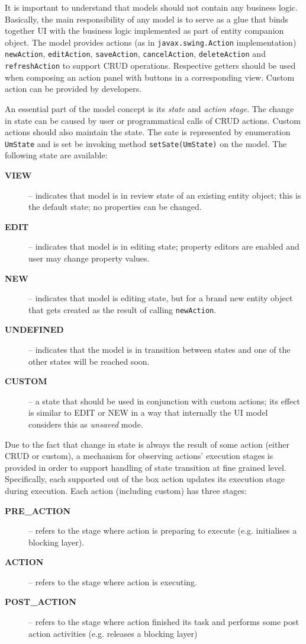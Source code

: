   It is important to understand that models should not contain any business logic.
  Basically, the main responsibility of any model is to serve as a glue that binds together UI with the business logic implemented as part of entity companion object.
  The model provides actions (as in \texttt{javax.swing.Action} implementation) \texttt{newAction}, \texttt{editAction}, \texttt{saveAction}, \texttt{cancelAction}, \texttt{deleteAction} and \texttt{refreshAction} to support CRUD operations.
  Respective getters should be used when composing an action panel with buttons in a corresponding view.
  Custom action can be provided by developers.
  
  An essential part of the model concept is its \emph{state} and \emph{action stage}.
  The change in state can be caused by user or programmatical calls of CRUD actions.
  Custom actions should also maintain the state.
  The sate is represented by enumeration \texttt{UmState} and is set be invoking method \texttt{setSate(UmState)} on the model.
  The following state are available:
  \begin{description}
    \item[\textbf{VIEW}] -- indicates that model is in review state of an existing entity object; this is the default state; no properties can be changed.
    \item[\textbf{EDIT}] -- indicates that model is in editing state; property editors are enabled and user may change property values.
    \item[\textbf{NEW}] -- indicates that model is editing state, but for a brand new entity object that gets created as the result of calling \texttt{newAction}.    
    \item[\textbf{UNDEFINED}] -- indicates that the model is in transition between states and one of the other states will be reached soon.    
    \item[\textbf{CUSTOM}] -- a state that should be used in conjunction with custom actions; its effect is similar to EDIT or NEW in a way that internally the UI model considers this as \emph{unsaved} mode.
  \end{description}
    
  Due to the fact that change in state is always the result of some action (either CRUD or custom), a mechanism for observing actions' execution stages is provided in order to support handling of state transition at fine grained level.
  Specifically, each supported out of the box action updates its execution stage during execution.
  Each action (including custom) has three stages:
  \begin{description}
    \item[\textbf{PRE\_ACTION}] -- refers to the stage where action is preparing to execute (e.g. initialises a blocking layer).
    \item[\textbf{ACTION}] -- refers to the stage where action is executing.
    \item[\textbf{POST\_ACTION}] -- refers to the stage where action finished its task and performs some post action activities (e.g. releases a blocking layer)
  \end{description}
  
